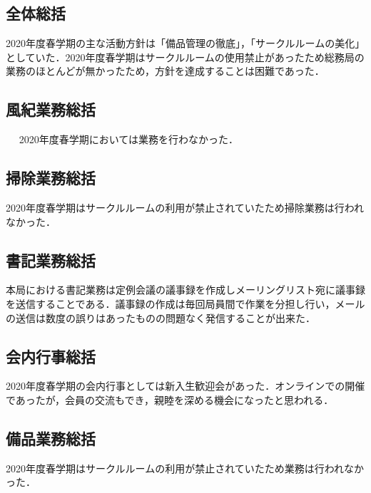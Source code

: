 \subsection*{全体総括}

2020年度春学期の主な活動方針は「備品管理の徹底」，「サークルルームの美化」としていた．2020年度春学期はサークルルームの使用禁止があったため総務局の業務のほとんどが無かったため，方針を達成することは困難であった．

\subsection*{風紀業務総括}　
2020年度春学期においては業務を行わなかった．

\subsection*{掃除業務総括}
2020年度春学期はサークルルームの利用が禁止されていたため掃除業務は行われなかった．

\subsection*{書記業務総括}
本局における書記業務は定例会議の議事録を作成しメーリングリスト宛に議事録を送信することである．議事録の作成は毎回局員間で作業を分担し行い，メールの送信は数度の誤りはあったものの問題なく発信することが出来た．

\subsection*{会内行事総括}
2020年度春学期の会内行事としては新入生歓迎会があった．オンラインでの開催であったが，会員の交流もでき，親睦を深める機会になったと思われる．

\subsection*{備品業務総括}
2020年度春学期はサークルルームの利用が禁止されていたため業務は行われなかった．


